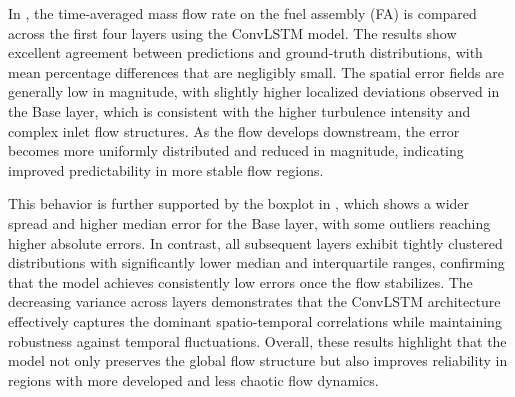 \documentclass[review]{elsarticle}
\theoremstyle{definition}
\theoremstyle{definition}
\theoremstyle{remark}
\begin{document}
In , the time-averaged mass flow rate on the fuel assembly (FA) is compared across the first four layers using the ConvLSTM model. The results show excellent agreement between predictions and ground-truth distributions, with mean percentage differences that are negligibly small. The spatial error fields are generally low in magnitude, with slightly higher localized deviations observed in the Base layer, which is consistent with the higher turbulence intensity and complex inlet flow structures. As the flow develops downstream, the error becomes more uniformly distributed and reduced in magnitude, indicating improved predictability in more stable flow regions.

This behavior is further supported by the boxplot in , which shows a wider spread and higher median error for the Base layer, with some outliers reaching higher absolute errors. In contrast, all subsequent layers exhibit tightly clustered distributions with significantly lower median and interquartile ranges, confirming that the model achieves consistently low errors once the flow stabilizes. The decreasing variance across layers demonstrates that the ConvLSTM architecture effectively captures the dominant spatio-temporal correlations while maintaining robustness against temporal fluctuations. Overall, these results highlight that the model not only preserves the global flow structure but also improves reliability in regions with more developed and less chaotic flow dynamics.
\end{document}
